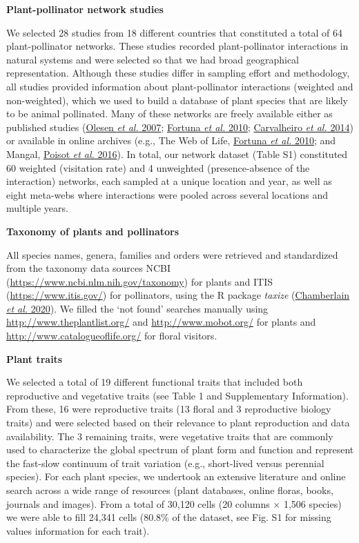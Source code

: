\documentclass[
  12pt,
  a4paper,
]{article}
\begin{document}
\textbf{Plant-pollinator network studies}

We selected 28 studies from 18 different countries that constituted a total of 64 plant-pollinator networks. These studies recorded plant-pollinator interactions in natural systems and were selected so that we had broad geographical representation. Although these studies differ in sampling effort and methodology, all studies provided information about plant-pollinator interactions (weighted and non-weighted), which we used to build a database of plant species that are likely to be animal pollinated. Many of these networks are freely available either as published studies (\protect\hyperlink{ref-olesen2007}{Olesen \emph{et al.} 2007}; \protect\hyperlink{ref-fortuna2010}{Fortuna \emph{et al.} 2010}; \protect\hyperlink{ref-carvalheiro2014}{Carvalheiro \emph{et al.} 2014}) or available in online archives (e.g., The Web of Life, \protect\hyperlink{ref-fortuna2010}{Fortuna \emph{et al.} 2010}; and Mangal, \protect\hyperlink{ref-poisot2016}{Poisot \emph{et al.} 2016}). In total, our network dataset (Table S1) constituted 60 weighted (visitation rate) and 4 unweighted (presence-absence of the interaction) networks, each sampled at a unique location and year, as well as eight meta-webs where interactions were pooled across several locations and multiple years.

\textbf{Taxonomy of plants and pollinators}

All species names, genera, families and orders were retrieved and standardized from the taxonomy data sources NCBI (\url{https://www.ncbi.nlm.nih.gov/taxonomy}) for plants and ITIS (\url{https://www.itis.gov/}) for pollinators, using the R package \emph{taxize} (\protect\hyperlink{ref-chamberlain2020}{Chamberlain \emph{et al.} 2020}). We filled the `not found' searches manually using \url{http://www.theplantlist.org/} and \url{http://www.mobot.org/} for plants and \url{http://www.catalogueoflife.org/} for floral visitors.

\textbf{Plant traits}

We selected a total of 19 different functional traits that included both reproductive and vegetative traits (see Table 1 and Supplementary Information). From these, 16 were reproductive traits (13 floral and 3 reproductive biology traits) and were selected based on their relevance to plant reproduction and data availability. The 3 remaining traits, were vegetative traits that are commonly used to characterize the global spectrum of plant form and function and represent the fast-slow continuum of trait variation (e.g., short-lived versus perennial species). For each plant species, we undertook an extensive literature and online search across a wide range of resources (plant databases, online floras, books, journals and images). From a total of 30,120 cells (20 columns × 1,506 species) we were able to fill 24,341 cells (80.8\% of the dataset, see Fig. S1 for missing values information for each trait).
\end{document}
